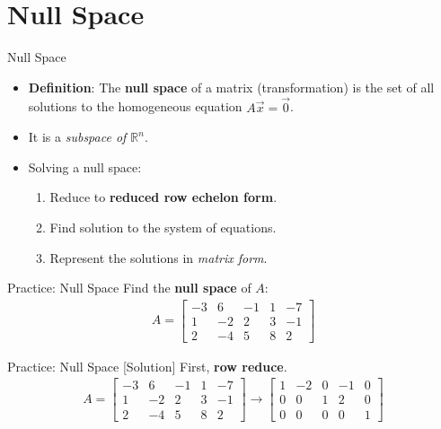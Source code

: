 \section{Null Space}

\begin{frame}{Null Space}
    \begin{itemize}
        \item \textbf{Definition}: The \textbf{null space} of a matrix (transformation) is the set of all solutions to the homogeneous equation $A\vec{x} = \vec{0}$.
        \item It is a \textit{subspace of $\mathbb{R}^n$}.
        \item Solving a null space:
        \begin{enumerate}
            \item Reduce to \textbf{reduced row echelon form}.
            \item Find solution to the system of equations.
            \item Represent the solutions in \textit{matrix form}.
        \end{enumerate}
    \end{itemize}
\end{frame}

\begin{frame}{Practice: Null Space}
    Find the \textbf{null space} of $A$:
    \begin{align*}
        A = \begin{bmatrix}
            -3 & 6 & -1 & 1 & -7 \\
            1 & -2 & 2 & 3 & -1 \\
            2 & -4 & 5 & 8 & 2
        \end{bmatrix}
    \end{align*}
\end{frame}

\begin{frame}{Practice: Null Space [Solution]}
    First, \textbf{row reduce}.
    \begin{align*}
        A = \begin{bmatrix}
            -3 & 6 & -1 & 1 & -7 \\
            1 & -2 & 2 & 3 & -1 \\
            2 & -4 & 5 & 8 & 2
        \end{bmatrix} \longrightarrow
        \begin{bmatrix}
            1 & -2 & 0 & -1 & 0 \\
            0 & 0 & 1 & 2 & 0 \\
            0 & 0 & 0 & 0 & 1
        \end{bmatrix}
    \end{align*}
\end{frame}

